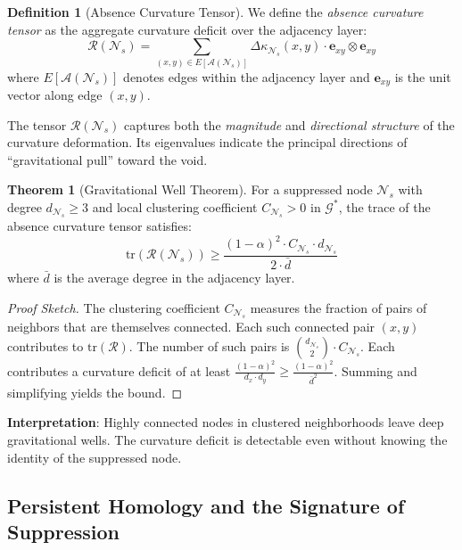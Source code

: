 \documentclass[12pt,a4paper]{article}
\theoremstyle{definition}
\newtheorem{definition}{Definition}[section]
\newtheorem{theorem}{Theorem}[section]
\theoremstyle{remark}
\newcommand{\NS}{\mathcal{N}_s}          %
\newcommand{\CA}{\mathcal{A}}            %
\newcommand{\Graph}{\mathcal{G}}         %
\begin{document}
\begin{definition}[Absence Curvature Tensor]
We define the \emph{absence curvature tensor} as the aggregate curvature deficit over the adjacency layer:
\begin{equation}
    \boxed{
    \mathcal{R}(\NS) = \sum_{(x,y) \in E[\CA(\NS)]} \Delta\kappa_{\NS}(x, y) \cdot \mathbf{e}_{xy} \otimes \mathbf{e}_{xy}
    }
\end{equation}
where $E[\CA(\NS)]$ denotes edges within the adjacency layer and $\mathbf{e}_{xy}$ is the unit vector along edge $(x,y)$.
\end{definition}

The tensor $\mathcal{R}(\NS)$ captures both the \emph{magnitude} and \emph{directional structure} of the curvature deformation. Its eigenvalues indicate the principal directions of ``gravitational pull'' toward the void.

\begin{theorem}[Gravitational Well Theorem]
\label{thm:gravitational-well}
For a suppressed node $\NS$ with degree $d_{\NS} \geq 3$ and local clustering coefficient $C_{\NS} > 0$ in $\Graph^*$, the trace of the absence curvature tensor satisfies:
\begin{equation}
    \text{tr}(\mathcal{R}(\NS)) \geq \frac{(1-\alpha)^2 \cdot C_{\NS} \cdot d_{\NS}}{2 \cdot \bar{d}}
\end{equation}
where $\bar{d}$ is the average degree in the adjacency layer.
\end{theorem}

\begin{proof}[Proof Sketch]
The clustering coefficient $C_{\NS}$ measures the fraction of pairs of neighbors that are themselves connected. Each such connected pair $(x,y)$ contributes to $\text{tr}(\mathcal{R})$. The number of such pairs is $\binom{d_{\NS}}{2} \cdot C_{\NS}$. Each contributes a curvature deficit of at least $\frac{(1-\alpha)^2}{d_x \cdot d_y} \geq \frac{(1-\alpha)^2}{\bar{d}^2}$. Summing and simplifying yields the bound.
\end{proof}

\textbf{Interpretation}: Highly connected nodes in clustered neighborhoods leave deep gravitational wells. The curvature deficit is detectable even without knowing the identity of the suppressed node.

\subsection{Persistent Homology and the Signature of Suppression}
\end{document}
